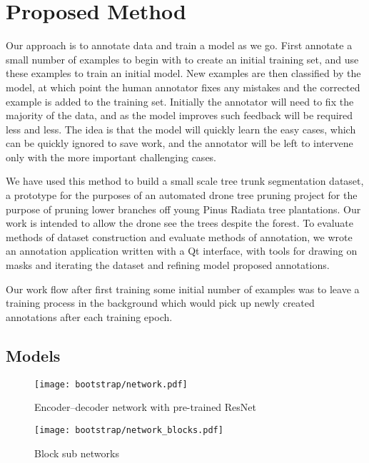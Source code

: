 




\section{Proposed Method}

Our approach is to annotate data and train a model as we go. First annotate a small number of examples to begin with to create an initial training set, and use these examples to train an initial model. New examples are then classified by the model, at which point the human annotator fixes any mistakes and the corrected example is added to the training set. Initially the annotator will need to fix the majority of the data, and as the model improves such feedback will be required less and less. The idea is that the model will quickly learn the easy cases, which can be quickly ignored to save work, and the annotator will be left to intervene only with the more important challenging cases.

We have used this method to build a small scale tree trunk segmentation dataset, a prototype for the purposes of an automated drone tree pruning project for the purpose of pruning lower branches off young Pinus Radiata tree plantations. Our work is intended to allow the drone see the trees despite the forest. To evaluate methods of dataset construction and evaluate methods of annotation, we wrote an annotation application written with a Qt interface, with tools for drawing on masks and iterating the dataset and refining model proposed annotations.

Our work flow after first training some initial number of examples was to leave a training process in the background which would pick up newly created annotations after each training epoch. 


\subsection {Models}

\begin{figure}[h]
  \centering
  \texttt{[image: bootstrap/network.pdf]}
  \caption{Encoder--decoder network with pre-trained ResNet}  
  \label{fig:bootstrap_network}
\end{figure}
\begin{figure}
  \centering
  \texttt{[image: bootstrap/network\_blocks.pdf]}
  \caption{Block sub networks}  
  \label{fig:bootstrap_decode_block}
\end{figure}

